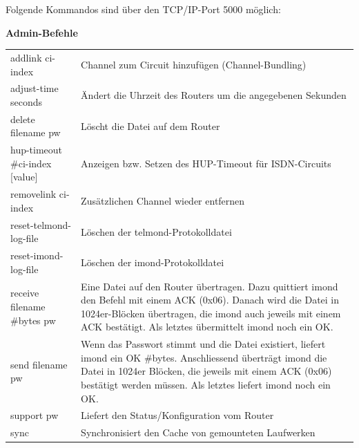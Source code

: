   Folgende Kommandos sind über den TCP/IP-Port 5000 möglich:
  \begin{table}
    \textbf{Admin-Befehle}

    \vspace{1ex}
    \begin{tabular}{lp{9cm}}

      addlink ci-index              & Channel zum Circuit hinzufügen
                                      (Channel-Bundling) \\
      adjust-time seconds           & Ändert die Uhrzeit des Routers um die
                                      angegebenen Sekunden \\
      delete filename pw            & Löscht die Datei auf dem Router \\
      hup-timeout \#ci-index [value]& Anzeigen bzw. Setzen des HUP-Timeout für
                                      ISDN-Circuits \\
      removelink ci-index           & Zusätzlichen Channel wieder entfernen \\
      reset-telmond-log-file        & Löschen der telmond-Protokolldatei \\
      reset-imond-log-file          & Löschen der imond-Protokolldatei \\
      receive filename \#bytes pw   & Eine Datei auf den Router übertragen.
                                      Dazu quittiert imond den Befehl mit
                                      einem ACK (0x06). Danach wird die Datei
                                      in 1024er-Blöcken übertragen, die imond
                                      auch jeweils mit einem ACK bestätigt.
                                      Als letztes übermittelt imond noch ein
                                      OK. \\
      send filename pw              & Wenn das Passwort stimmt und die Datei
                                      existiert, liefert imond ein OK \#bytes.
                                      Anschliessend überträgt imond die Datei
                                      in 1024er Blöcken, die jeweils mit
                                      einem ACK (0x06) bestätigt werden
                                      müssen. Als letztes liefert imond noch
                                      ein OK. \\
      support pw                    & Liefert den Status/Konfiguration vom
                                      Router \\
      sync                          & Synchronisiert den Cache von gemounteten
                                      Laufwerken \\
    \end{tabular}
  \end{table}


